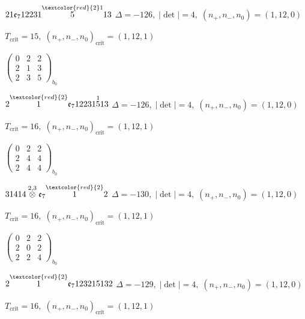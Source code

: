 \documentclass[10pt]{article}
\begin{document}
\smallskip

$21\mathfrak{e}_712231\overset{\textcolor{red}{2}1}{5}13$ \quad $\Delta=-126,\; |\det|=4,\; (n_+,n_-,n_0)=(1,12,0)$

\hspace{1em}$T_{\text{crit}}=15,\; (n_+,n_-,n_0)_{\text{crit}}=(1,12,1)$

\hspace{2em}$\left(\begin{smallmatrix}0 & 2 & 2 \\ 2 & 1 & 3 \\ 2 & 3 & 5\end{smallmatrix}\right)_{\!b_0}$

$2\overset{\textcolor{red}{2}}{1}\mathfrak{e}_712231\overset{1}{5}13$ \quad $\Delta=-126,\; |\det|=4,\; (n_+,n_-,n_0)=(1,12,0)$

\hspace{1em}$T_{\text{crit}}=16,\; (n_+,n_-,n_0)_{\text{crit}}=(1,12,1)$

\hspace{2em}$\left(\begin{smallmatrix}0 & 2 & 2 \\ 2 & 4 & 4 \\ 2 & 4 & 4\end{smallmatrix}\right)_{\!b_0}$

\smallskip

$31414\overset{2,3}{\otimes}\mathfrak{e}_7\overset{\textcolor{red}{2}}{1}2$ \quad $\Delta=-130,\; |\det|=4,\; (n_+,n_-,n_0)=(1,12,0)$

\hspace{1em}$T_{\text{crit}}=16,\; (n_+,n_-,n_0)_{\text{crit}}=(1,12,1)$

\hspace{2em}$\left(\begin{smallmatrix}0 & 2 & 2 \\ 2 & 0 & 2 \\ 2 & 2 & 4\end{smallmatrix}\right)_{\!b_0}$

\smallskip

$2\overset{\textcolor{red}{2}}{1}\mathfrak{e}_7123215132$ \quad $\Delta=-129,\; |\det|=4,\; (n_+,n_-,n_0)=(1,12,0)$

\hspace{1em}$T_{\text{crit}}=16,\; (n_+,n_-,n_0)_{\text{crit}}=(1,12,1)$
\end{document}
